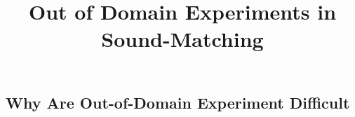 \documentclass[12pt, oneside]{article} %
\title{Out of Domain Experiments in Sound-Matching}
\begin{document}
\maketitle

\subsection{Why Are Out-of-Domain Experiment Difficult}



\end{document}
